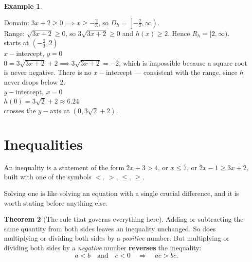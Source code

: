 \documentclass[11pt,a4paper]{article}
\theoremstyle{definition}
\newtheorem{thm}{Theorem}[section]
\newtheorem{example}[thm]{Example}
\begin{document}
\begin{example}
\begin{enumerate}
Domain: $3x+2\geq0\implies x\geq-\frac{2}{3}$, so
$D_h=\left[-\frac{2}{3},\infty\right)$.\\

Range: $\sqrt{3x+2}\geq0$, so $3\sqrt{3x+2}\geq0$ and $h(x)\geq2$. Hence
$R_h=[2,\infty)$.\\

starts at $\left(-\frac{2}{3},2\right)$\\

$x-$intercept, $y=0$\\
$0=3\sqrt{3x+2}+2\implies 3\sqrt{3x+2}=-2$, which is impossible because a square
root is never negative. There is no $x-$intercept --- consistent with the range,
since $h$ never drops below $2$.\\

$y-$intercept, $x=0$\\
$h(0)=3\sqrt{2}+2\approx6.24$\\

crosses the $y-$axis at $\left(0,3\sqrt{2}+2\right)$.

\begin{figure}[H]
\centering
{}
\end{figure}
\end{enumerate}
\end{example}
\pagebreak
\section{Inequalities}
An inequality is a statement of the form $2x+3>4$, or $x\leq 7$, or
$2x-1\geq 3x+2$, built with one of the symbols $<$, $>$, $\leq$, $\geq$.

Solving one is like solving an equation with a single crucial difference, and it
is worth stating before anything else.

\begin{thm}[The rule that governs everything here]
Adding or subtracting the same quantity from both sides leaves an inequality
unchanged. So does multiplying or dividing both sides by a \emph{positive} number.
But multiplying or dividing both sides by a \emph{negative} number \textbf{reverses}
the inequality:
$$a<b \quad \text{and}\quad  c<0
\quad \Longrightarrow\quad  ac>bc .$$
\end{thm}
\end{document}
